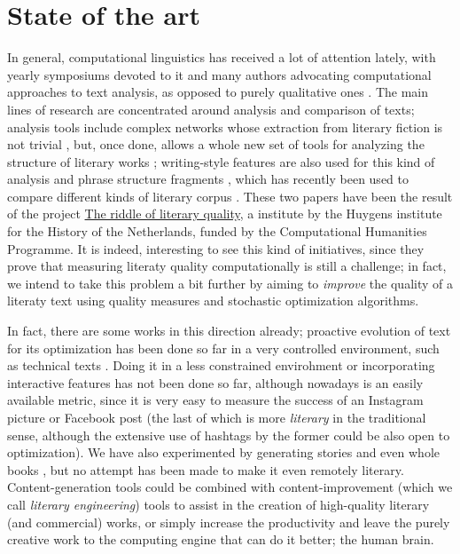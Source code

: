 \documentclass[a4paper,12pt,twocolumn]{article}
\begin{document}
\section{State of the art}

In general, computational linguistics  has received a lot of
attention lately, with yearly symposiums devoted to it and many
authors advocating computational approaches to text analysis, as
opposed to purely qualitative ones \cite{roque2012towards}. The main lines
of research are concentrated around analysis and comparison of texts;
analysis tools include complex networks
\cite{1367-2630-14-4-043029,0295-5075-100-5-58002} whose extraction
from literary fiction is not trivial \cite{elson2010extracting}, but,
once done, allows a whole new set of tools for analyzing the structure
of literary works \cite{seo14:snf};  writing-style
features \cite{ASI:ASI20316} are also used for this kind of analysis
and phrase structure fragments \cite{van2012literary}, which has
recently been used to compare different kinds of literary corpus
\cite{jautze2013high}. These two papers have been the result of the
project \href{http://literaryquality.huygens.knaw.nl/}{The riddle of
  literary quality}, a institute by the Huygens institute for the
History of the Netherlands, funded by the Computational Humanities
Programme. It is indeed, interesting to see this kind of initiatives,
since they prove that measuring literaty quality computationally is
still a challenge; in fact, we intend to take this problem a bit
further by aiming to {\em improve} the quality of a literaty text
using quality measures and stochastic optimization algorithms. 

In fact, there are some works in this direction already; proactive evolution of text for its optimization has been done so far
in a very controlled environment, such as technical texts
\cite{Rascu06acontrolled,hernandez2004checking}. Doing it in a less
constrained envirohment or incorporating interactive features
has not been done so far, although nowadays is an easily available
metric, since it is very easy to measure the success of an Instagram
picture or Facebook post (the last of which is more {\em literary} in
the traditional sense, although the extensive use of hashtags by the
former could be also open to optimization). We have also experimented
by generating stories \cite{2014arXiv1403.3084G} and even whole books
\cite{Merelo201401}, but no attempt has been made to make it even
remotely literary. Content-generation tools could be combined with
content-improvement (which we call {\em literary engineering}) tools
to assist in the creation of high-quality literary (and commercial)
works, or simply increase the productivity and leave the purely
creative work to the computing engine that can do it better; the human
brain. 
\end{document}
